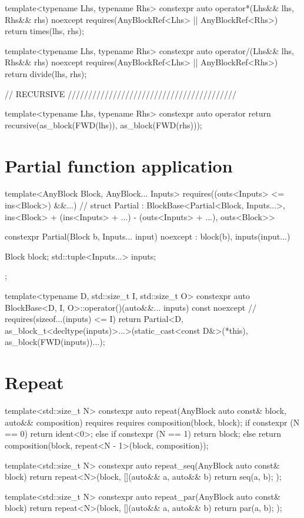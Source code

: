 \begin{cppcodenl}
  template<typename Lhs, typename Rhs>
  constexpr auto operator*(Lhs&& lhs, Rhs&& rhs) noexcept requires(AnyBlockRef<Lhs> || AnyBlockRef<Rhs>)
  {
    return times(lhs, rhs);
  }

  template<typename Lhs, typename Rhs>
  constexpr auto operator/(Lhs&& lhs, Rhs&& rhs) noexcept requires(AnyBlockRef<Lhs> || AnyBlockRef<Rhs>)
  {
    return divide(lhs, rhs);
  }

  // RECURSIVE /////////////////////////////////////////

  template<typename Lhs, typename Rhs>
  constexpr auto operator%
  {
    return recursive(as_block(FWD(lhs)), as_block(FWD(rhs)));
  }
\end{cppcodenl}

\section{Partial function application}
\label{sec:eda_partial_application}
\begin{cppcodenl}
  template<AnyBlock Block, AnyBlock... Inputs>
  requires((outs<Inputs> <= ins<Block>) &&...) //
    struct Partial
    : BlockBase<Partial<Block, Inputs...>, ins<Block> + (ins<Inputs> + ...) - (outs<Inputs> + ...), outs<Block>> {
    constexpr Partial(Block b, Inputs... input) noexcept : block(b), inputs(input...) {}

    Block block;
    std::tuple<Inputs...> inputs;
  };

  template<typename D, std::size_t I, std::size_t O>
  constexpr auto BlockBase<D, I, O>::operator()(auto&&... inputs) const noexcept //
    requires(sizeof...(inputs) <= I)
  {
    return Partial<D, as_block_t<decltype(inputs)>...>(static_cast<const D&>(*this), as_block(FWD(inputs))...);
  }
\end{cppcodenl}

\section{Repeat}
\begin{cppcodenl}
  template<std::size_t N>
  constexpr auto repeat(AnyBlock auto const& block, auto&& composition) requires requires
  {
    composition(block, block);
  }
  {
    if constexpr (N == 0) {
      return ident<0>;
    } else if constexpr (N == 1) {
      return block;
    } else {
      return composition(block, repeat<N - 1>(block, composition));
    }
  }

  template<std::size_t N>
  constexpr auto repeat_seq(AnyBlock auto const& block)
  {
    return repeat<N>(block, [](auto&& a, auto&& b) { return seq(a, b); });
  }

  template<std::size_t N>
  constexpr auto repeat_par(AnyBlock auto const& block)
  {
    return repeat<N>(block, [](auto&& a, auto&& b) { return par(a, b); });
  }
\end{cppcodenl}

